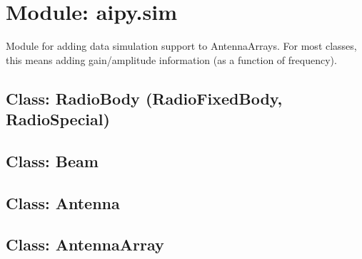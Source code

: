 \section{Module: aipy.sim}

Module for adding data simulation support to AntennaArrays.  For most classes,
this means adding gain/amplitude information (as a function of frequency).

\subsection{Class: RadioBody (RadioFixedBody, RadioSpecial)}

\subsection{Class: Beam}

\subsection{Class: Antenna}

\subsection{Class: AntennaArray}

